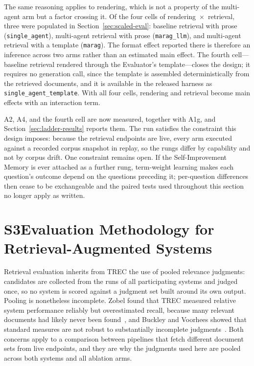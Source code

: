 \documentclass[acmsmall,anonymous,screen]{acmart}
\begin{document}
The same reasoning applies to rendering, which is not a property of the
multi-agent arm but a factor crossing it. Of the four cells of
rendering~$\times$~retrieval, three were populated in
Section~\ref{sec:scaled-eval}: baseline retrieval with prose
(\texttt{single\_agent}), multi-agent retrieval with prose
(\texttt{marag\_llm}), and multi-agent retrieval with a template
(\texttt{marag}). The format effect reported there is therefore an inference
across two arms rather than an estimated main effect. The fourth cell---baseline
retrieval rendered through the Evaluator's template---closes the design; it
requires no generation call, since the template is assembled deterministically
from the retrieved documents, and it is available in the released harness as
\texttt{single\_agent\_template}. With all four cells, rendering and retrieval
become main effects with an interaction term.

A2, A4, and the fourth cell are now measured, together with A1g, and
Section~\ref{sec:ladder-results} reports them. The run satisfies the constraint
this design imposes: because the retrieval endpoints are live, every arm
executed against a recorded corpus snapshot in replay, so the rungs differ by
capability and not by corpus drift. One constraint remains open. If the
Self-Improvement Memory is ever attached as a further rung, term-weight
learning makes each question's outcome depend on the questions preceding it;
per-question differences then cease to be exchangeable and the paired tests
used throughout this section no longer apply as written.



\section*{S3\quad Evaluation Methodology for Retrieval-Augmented Systems}

Retrieval evaluation inherits from TREC the use of pooled relevance judgments:
candidates are collected from the runs of all participating systems and judged
once, so no system is scored against a judgment set built around its own output.
Pooling is nonetheless incomplete. Zobel found that TREC measured relative system
performance reliably but overestimated recall, because many relevant documents
had likely never been found~\cite{zobel1998reliable}, and Buckley and Voorhees
showed that standard measures are not robust to substantially incomplete
judgments~\cite{buckley2004incomplete}. Both concerns apply to a comparison
between pipelines that fetch different document sets from live endpoints, and
they are why the judgments used here are pooled across both systems and all
ablation arms.
\end{document}
